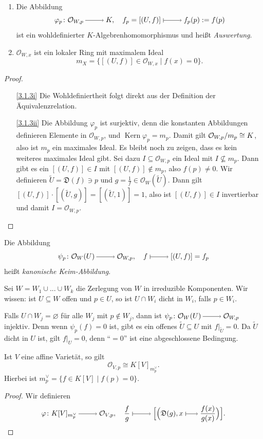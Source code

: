 \documentclass[a4paper,12pt]{scrbook}
\newtheorem{proof}{Beweis}
\def\O{\mathcal{O}}
\newcommand{\D}{\mathfrak{D}}
\newcommand{\Kern}{\operatorname{Kern}}
\renewcommand{\phi}{\varphi}
\newcommand{\leer}{\ensuremath{\varnothing}}
\newcommand{\restrict}[1]{|_{#1}}
\renewcommand{\dotsc}{\ensuremath{\!...}}
\newcommand{\smapsto}{\raisebox{-1pt}{\tikz{\draw[thin,shorten >=3pt, |->] (0,0) node{\hspace*{0pt}} -- node{} (0.7,0);}}\penalty1000\relax}
\newcommand{\ra}{\raisebox{-1pt}{\tikz{\draw[thin,shorten >=3pt, ->] (0,0) node{\hspace*{-2pt}} -- node{} (1,0);}}\penalty1000\relax}
\renewcommand{\mapsto}{\raisebox{-1pt}{\tikz{\draw[thin,shorten >=3pt, |->] (0,0) node{\hspace*{0pt}} -- node{} (1,0);}}\penalty1000\relax}
\newcommand{\Quotient}[2]{
  \mathchoice
  { %
    \raisebox{0.7ex}{\ensuremath{#1}}
    \ensuremath{\mkern-3mu}\big/\ensuremath{\mkern-3mu}
    \raisebox{-0.6ex}{\ensuremath{#2}}
  }
  { %
    #1/#2
  }
  { %
    #1/#2
  }
  { %
    #1/#2
  }
}
\begin{document}
\begin{bem}\label{3.1.3}
  \begin{enumerate}
  \item{} Die Abbildung \[ \phi_{p}\colon \O_{W,p}\ra K,\quad f_p=[(U,f)]\mapsto f_p(p):=f(p) \]
    ist ein wohldefinierter $K$-Algebrenhomomorphismus und heißt \emph{Auswertung}.
  \item{} $\O_{W,x}$ ist ein lokaler Ring mit maximalem Ideal \[ m_X = \{ [(U,f)]\in\O_{W,x}\mid f(x)=0\}. \]
  \end{enumerate}
\end{bem}
\begin{proof}
  \begin{enumerate}
  \item[\ref{3.1.3i}] Die Wohldefiniertheit folgt direkt aus der Definition der Äquivalenzrelation.
  \item[\ref{3.1.3ii}] Die Abbildung $\phi_p$ ist surjektiv, denn die konstanten Abbildungen definieren Elemente in $\O_{W,p}$,
    und $\Kern \phi_p=m_p$. Damit gilt $\Quotient{\O_{W,p}}{m_p}\cong K$, also ist $m_p$ ein maximales Ideal. Es bleibt noch zu
    zeigen, dass es kein weiteres maximales Ideal gibt. Sei dazu $I\subseteq\O_{W,p}$ ein Ideal mit $I\not\subseteq m_p$. Dann
    gibt es ein $[(U,f)]\in I$ mit $[(U,f)]\notin m_p$, also $f(p)\neq0$. Wir definieren $\tilde{U}=\D(f)\ni p$ und
    $g=\frac1f\in\O_W(\tilde{U})$. Dann gilt $[(U,f)]\cdot[(\tilde{U},g)]=[(\tilde{U},1)]=1$, also ist $[(U,f)]\in I$
    invertierbar und damit $I=\O_{W,p}$.
  \end{enumerate}
\end{proof}

\begin{bem}\label{3.1.4}
  Die Abbildung \[ \psi_p\colon \O_W(U)\ra\O_{W,p},\quad f\mapsto[(U,f)]=f_p \] heißt \emph{kanonische Keim-Abbildung}.

  Sei $W=W_1\cup\dotsc\cup W_k$ die Zerlegung von $W$ in irreduzible Komponenten. Wir wissen: ist $U\subseteq W$ offen und $p\in
  U$, so ist $U\cap W_i$ dicht in $W_i$, falls $p\in W_i$.

  Falls $U\cap W_j=\leer$ für alle $W_j$ mit $p\notin W_j$, dann ist $\psi_p\colon\O_W(U)\ra\O_{W,p}$ injektiv. Denn wenn
  $\psi_p(f)=0$ ist, gibt es ein offenes $\tilde{U}\subseteq U$ mit $f\restrict{\tilde{U}}=0$. Da $\tilde{U}$ dicht in $U$ ist,
  gilt $f\restrict{U}=0$, denn \enquote{$=0$} ist eine abgeschlossene Bedingung.
\end{bem}

\begin{prop}\label{3.1.5}
  Ist $V$ eine affine Varietät, so gilt \[ \O_{V,p}\cong K[V]_{m_p^\vee}. \]
  Hierbei ist $m_p^\vee = \{ f\in K[V] \mid f(p)=0\}$.
\end{prop}
\begin{proof}
  Wir definieren
  \[ \phi\colon K[V]_{m_p^\vee}\ra\O_{V,p},\quad\frac{f}{g}\mapsto\Bigl[\Bigl(\D(g),x\smapsto\frac{f(x)}{g(x)}\Bigr)\Bigr]. \]
\end{proof}
\end{document}
